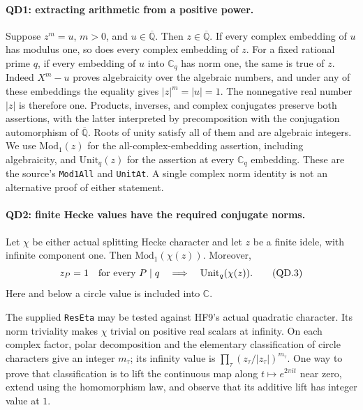 \paragraph{QD1: extracting arithmetic from a positive power.}
Suppose $z^m=u$, $m>0$, and $u\in\overline{\mathbb Q}$.
Then $z\in\overline{\mathbb Q}$.  If every complex embedding of
$u$ has modulus one, so does every complex embedding of $z$.
For a fixed rational prime $q$, if every embedding of $u$ into
$\mathbb C_q$ has norm one, the same is true of $z$.
Indeed $X^m-u$ proves algebraicity over the algebraic numbers,
and under any of these embeddings the equality gives
$|z|^m=|u|=1$.  The nonnegative real number $|z|$ is therefore
one.  Products, inverses, and complex conjugates preserve both
assertions, with the latter interpreted by precomposition with
the conjugation automorphism of $\overline{\mathbb Q}$.
Roots of unity satisfy all of them and are algebraic integers.
We use $\mathrm{Mod}_1(z)$ for the all-complex-embedding assertion,
including algebraicity, and $\mathrm{Unit}_q(z)$ for the assertion
at every $\mathbb C_q$ embedding.  These are the source's
\texttt{Mod1All} and \texttt{UnitAt}.  A single complex norm
identity is not an alternative proof of either statement.

\paragraph{QD2: finite Hecke values have the required conjugate norms.}
Let $\chi$ be either actual splitting Hecke character and let $z$
be a finite idele, with infinite component one.  Then
$\mathrm{Mod}_1(\chi(z))$.  Moreover,
\[
 z_P=1\quad\hbox{for every }P\mid q
                  \quad\Longrightarrow\quad
                       \mathrm{Unit}_q(\chi(z)).          \tag{QD.3}
\]
Here and below a circle value is included into $\mathbb C$.

The supplied \texttt{ResEta} may be tested against HF9's actual
quadratic character.  Its norm triviality makes $\chi$ trivial
on positive real scalars at infinity.  On each complex factor,
polar decomposition and the elementary classification of circle
characters give an integer $m_\tau$; its infinity value is
$\prod_\tau(z_\tau/|z_\tau|)^{m_\tau}$.  One way to prove that
classification is to lift the continuous map along
$t\mapsto e^{2\pi i t}$ near zero, extend using the homomorphism
law, and observe that its additive lift has integer value at $1$.

